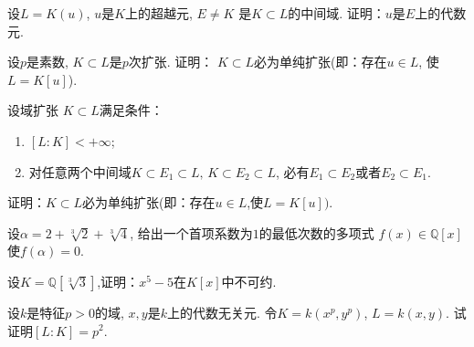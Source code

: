 \begin{solution}
    
\end{solution}

\begin{problem}
    设$L = K(u)$, $u$是$K$上的超越元, $E \neq K$
是$K\subset L$的中间域. 证明：$u$是$E$上的代数元.
\end{problem}

\begin{solution}
    
\end{solution}

\begin{problem}
    设$p$是素数, $K \subset L$是$p$次扩张. 证明：
$K \subset L$必为单纯扩张(即：存在$u \in L$, 使$L = K[u]$).
\end{problem}

\begin{solution}
    
\end{solution}

\begin{problem}
    设域扩张 $K \subset L$满足条件：
\begin{enumerate}[(1)]
    \item $[L:K] < +\infty$;
    \item 对任意两个中间域$K \subset E_1 \subset L,\, K \subset E_2 \subset L$,
必有$E_1 \subset E_2$或者$E_2 \subset E_1$.
\end{enumerate}
证明：$K \subset L$必为单纯扩张(即：存在$u \in L$,使$L = K[u])$.
\end{problem}

\begin{solution}
    
\end{solution}

\begin{problem}
    设$\alpha = 2 + \sqrt[3]{2} + \sqrt[3]{4}$,
给出一个首项系数为$1$的最低次数的多项式
$f(x) \in \mathbb{Q}[x]$使$f(\alpha) = 0$.
\end{problem}

\begin{solution}
    
\end{solution}

\begin{problem}
    设$K = \mathbb{Q}[\sqrt[3]{3}]$,证明：$x^5 - 5$在$K[x]$中不可约.
\end{problem}

\begin{solution}
    
\end{solution}

\begin{problem}
    设$k$是特征$p > 0$的域, $x, y$是$k$上的代数无关元.
令$K = k(x^{p}, y^{p})$, $L = k(x, y)$. 
试证明$[L:K] = p^{2}$.
\end{problem}

\begin{solution}
    
\end{solution}